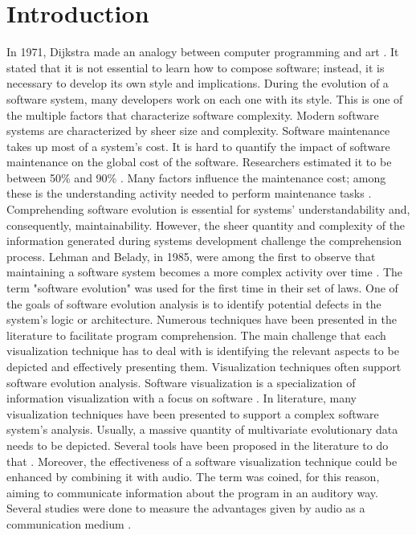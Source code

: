 \chapter{Introduction}

In 1971, Dijkstra made an analogy between computer programming and art \cite{Dijkstra1971a}.
It stated that it is not essential to learn how to compose software; instead, it is necessary to develop its own style and implications. 
During the evolution of a software system, many developers work on each one with its style.
 This is one of the multiple factors that characterize software complexity. 
Modern software systems are characterized by sheer size and complexity. Software maintenance takes up most of a system's cost. It is hard to quantify the impact of software maintenance on the global cost of the software. 
Researchers estimated it to be between 50\% and 90\% \cite{Davis1995} \cite{Sommerville1995}\cite{Erlikh2000} \cite{seacord2003}. Many factors influence the maintenance cost; among these is the understanding activity needed to perform maintenance tasks \cite{Corbi1989}. Comprehending software evolution is essential for systems' understandability and, consequently, maintainability. However, the sheer quantity and complexity of the information generated during systems development challenge the comprehension process. Lehman and Belady, in 1985, were among the first to observe that maintaining a software system becomes a more complex activity over time \cite{Lehman1985}. The term "software evolution" was used for the first time in their set of laws.  One of the goals of software evolution analysis is to identify potential defects in the system's logic or architecture. Numerous techniques have been presented in the literature to facilitate program comprehension. The main challenge that each visualization technique has to deal with is identifying the relevant aspects to be depicted and effectively presenting them. Visualization techniques often support software evolution analysis. Software visualization is a specialization of information visualization with a focus on software \cite{Lanza2003}. In literature, many visualization techniques have been presented to support a complex software system's analysis. Usually, a massive quantity of multivariate evolutionary data needs to be depicted. Several tools have been proposed in the literature to do that \cite{Merino2018a}. Moreover, the effectiveness of a software visualization technique could be enhanced by combining it with audio. The term  was coined, for this reason, aiming to communicate information about the program in an auditory way.
Several studies were done to measure the advantages given by audio as a communication medium \cite{Alty1995}.

